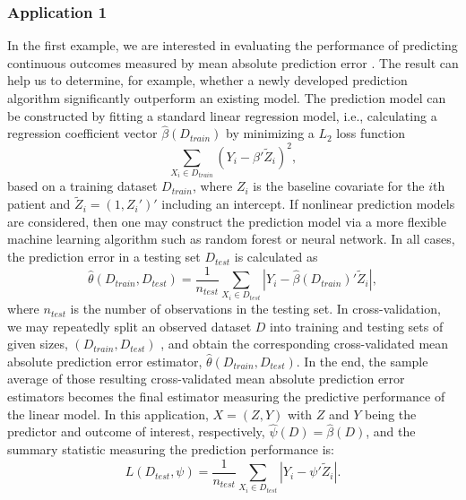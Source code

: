 \documentclass[12pt]{article}
\begin{document}
\subsubsection{Application 1} \label{sec:application1}
In the first example, we are interested in evaluating the performance of predicting continuous outcomes measured by mean absolute prediction error \cite{tian2007model, willmott2005advantages}.  The result can help us to determine, for example, whether a newly developed prediction algorithm significantly outperform an existing model.
The prediction model can be constructed by fitting a standard linear regression model, i.e., calculating a regression coefficient vector $\hat{\beta}(D_{train})$ by minimizing a $L_2$ loss function
$$ \sum_{X_i\in D_{train} } \left(Y_i- \beta'\widetilde{Z}_i \right)^2,$$
based on a training dataset $D_{train}$, where  $Z_i$ is the baseline covariate for the $i$th patient and $\widetilde{Z}_i=(1, Z_i')'$ including an intercept.   If nonlinear prediction models are considered, then one may construct the prediction model via a more flexible machine learning algorithm such as random forest or neural network.   In all cases, the prediction error in a testing set $D_{test}$ is calculated as 
$$\hat{\theta}(D_{train}, D_{test})=\frac{1}{n_{test}}\sum_{X_i \in D_{test}}|Y_i-\hat{\beta}(D_{train})'\tilde{Z}_i|,$$
where $n_{test}$ is the number of observations in the testing set. In cross-validation, we may repeatedly split an observed dataset $D$ into training and testing sets of given sizes, $(D_{train}, D_{test})$ , and obtain the corresponding cross-validated mean absolute prediction error estimator, $\hat{\theta}(D_{train}, D_{test})$.  In the end, the sample average of those resulting cross-validated mean absolute prediction error estimators becomes the final estimator measuring the predictive performance of the linear model. In this application, $X=(Z, Y)$ with $Z$ and $Y$ being the predictor and  outcome of interest, respectively, $\hat{\psi}(D)=\hat{\beta}(D)$, and the summary statistic measuring the prediction performance is:
$$L\left(D_{test}, \psi\right)=\frac{1}{n_{test}}\sum_{X_i\in D_{test}}|Y_i-\psi'\widetilde{Z}_i|.$$
\end{document}
